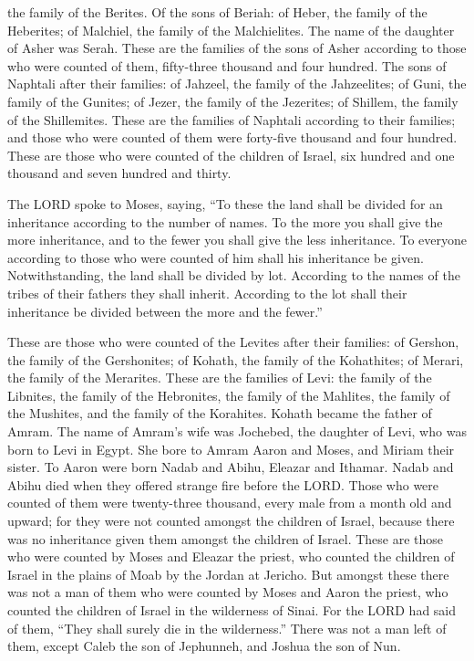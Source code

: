 the family of the Berites.  Of the sons of Beriah: of
Heber, the family of the Heberites; of Malchiel, the family of the
Malchielites.  The name of the daughter of Asher was Serah.
 These are the families of the sons of Asher according to
those who were counted of them, fifty-three thousand and four hundred.
 The sons of Naphtali after their families: of Jahzeel, the
family of the Jahzeelites; of Guni, the family of the Gunites;
 of Jezer, the family of the Jezerites; of Shillem, the
family of the Shillemites.  These are the families of
Naphtali according to their families; and those who were counted of them
were forty-five thousand and four hundred.  These are those
who were counted of the children of Israel, six hundred and one thousand
and seven hundred and thirty.

 The LORD spoke to Moses, saying,  ``To these
the land shall be divided for an inheritance according to the number of
names.  To the more you shall give the more inheritance,
and to the fewer you shall give the less inheritance. To everyone
according to those who were counted of him shall his inheritance be
given.  Notwithstanding, the land shall be divided by lot.
According to the names of the tribes of their fathers they shall
inherit.  According to the lot shall their inheritance be
divided between the more and the fewer.''

 These are those who were counted of the Levites after
their families: of Gershon, the family of the Gershonites; of Kohath,
the family of the Kohathites; of Merari, the family of the Merarites.
 These are the families of Levi: the family of the
Libnites, the family of the Hebronites, the family of the Mahlites, the
family of the Mushites, and the family of the Korahites. Kohath became
the father of Amram.  The name of Amram's wife was
Jochebed, the daughter of Levi, who was born to Levi in Egypt. She bore
to Amram Aaron and Moses, and Miriam their sister.  To
Aaron were born Nadab and Abihu, Eleazar and Ithamar. 
Nadab and Abihu died when they offered strange fire before the LORD.
 Those who were counted of them were twenty-three thousand,
every male from a month old and upward; for they were not counted
amongst the children of Israel, because there was no inheritance given
them amongst the children of Israel.  These are those who
were counted by Moses and Eleazar the priest, who counted the children
of Israel in the plains of Moab by the Jordan at Jericho. 
But amongst these there was not a man of them who were counted by Moses
and Aaron the priest, who counted the children of Israel in the
wilderness of Sinai.  For the LORD had said of them, ``They
shall surely die in the wilderness.'' There was not a man left of them,
except Caleb the son of Jephunneh, and Joshua the son of Nun.

